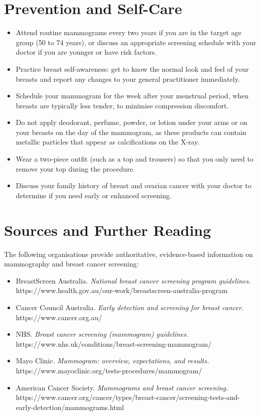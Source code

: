 \section*{Prevention and Self-Care}
\begin{itemize}
    \item Attend routine mammograms every two years if you are in the target age group (50 to 74 years), or discuss an appropriate screening schedule with your doctor if you are younger or have risk factors.
    \item Practice breast self-awareness: get to know the normal look and feel of your breasts and report any changes to your general practitioner immediately.
    \item Schedule your mammogram for the week after your menstrual period, when breasts are typically less tender, to minimise compression discomfort.
    \item Do not apply deodorant, perfume, powder, or lotion under your arms or on your breasts on the day of the mammogram, as these products can contain metallic particles that appear as calcifications on the X-ray.
    \item Wear a two-piece outfit (such as a top and trousers) so that you only need to remove your top during the procedure.
    \item Discuss your family history of breast and ovarian cancer with your doctor to determine if you need early or enhanced screening.
\end{itemize}

\section*{Sources and Further Reading}
The following organisations provide authoritative, evidence-based information on mammography and breast cancer screening:
\begin{itemize}
    \item BreastScreen Australia. \textit{National breast cancer screening program guidelines.} https://www.health.gov.au/our-work/breastscreen-australia-program
    \item Cancer Council Australia. \textit{Early detection and screening for breast cancer.} https://www.cancer.org.au/
    \item NHS. \textit{Breast cancer screening (mammogram) guidelines.} https://www.nhs.uk/conditions/breast-screening-mammogram/
    \item Mayo Clinic. \textit{Mammogram: overview, expectations, and results.} https://www.mayoclinic.org/tests-procedures/mammogram/
    \item American Cancer Society. \textit{Mammograms and breast cancer screening.} https://www.cancer.org/cancer/types/breast-cancer/screening-tests-and-early-detection/mammograms.html
\end{itemize}
